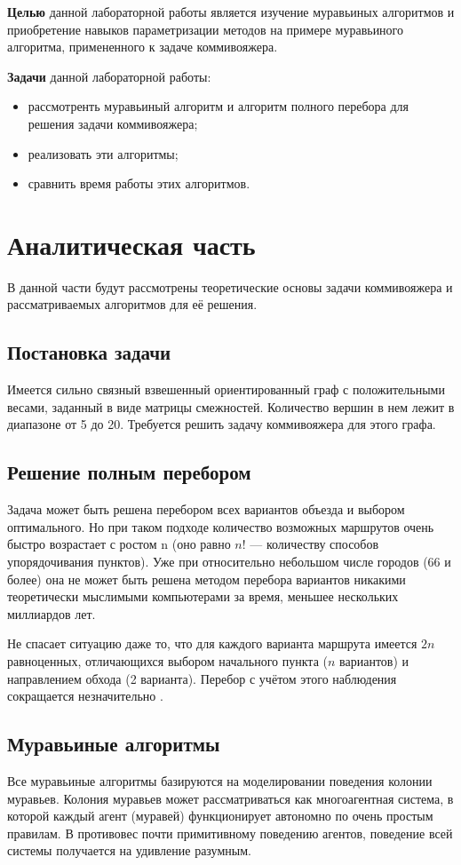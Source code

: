 \documentclass[12pt]{report}
\begin{document}
        
\textbf{Целью} данной лабораторной работы является изучение муравьиных алгоритмов и приобретение навыков параметризации методов на примере муравьиного алгоритма, примененного к задаче коммивояжера.
        
\textbf{Задачи} данной лабораторной работы:
\begin{itemize}
	\item рассмотренть муравьиный алгоритм и алгоритм полного перебора для решения задачи коммивояжера;
	\item реализовать эти алгоритмы;
	\item сравнить время работы этих алгоритмов.
\end{itemize}



\chapter{Аналитическая часть}
В данной части будут рассмотрены теоретические основы задачи коммивояжера и рассматриваемых алгоритмов для её решения. 
		
\section{Постановка задачи} 
Имеется сильно связный взвешенный ориентированный граф \cite{diskr} с положительными весами, заданный в виде матрицы смежностей. Количество вершин в нем лежит в диапазоне от 5 до 20. Требуется решить задачу коммивояжера для этого графа. 

\section{Решение полным перебором}
Задача может быть решена перебором всех вариантов объезда и выбором оптимального. Но при таком подходе количество возможных маршрутов очень быстро возрастает с ростом n (оно равно $n!$ — количеству способов упорядочивания пунктов). Уже при относительно небольшом числе городов (66 и более) она не может быть решена методом перебора вариантов никакими теоретически мыслимыми компьютерами за время, меньшее нескольких миллиардов лет. 

Не спасает ситуацию даже то, что для каждого варианта маршрута имеется $2n$ равноценных, отличающихся выбором начального пункта ($n$ вариантов) и направлением обхода (2 варианта). Перебор с учётом этого наблюдения сокращается незначительно \cite{commi2}.	

\section{Муравьиные алгоритмы}
Все муравьиные алгоритмы базируются на моделировании поведения колонии муравьев. Колония муравьев может рассматриваться как многоагентная система, в которой каждый агент (муравей) функционирует автономно по очень простым правилам. В противовес почти примитивному поведению агентов, поведение всей системы получается на удивление разумным.
		
\end{document}
